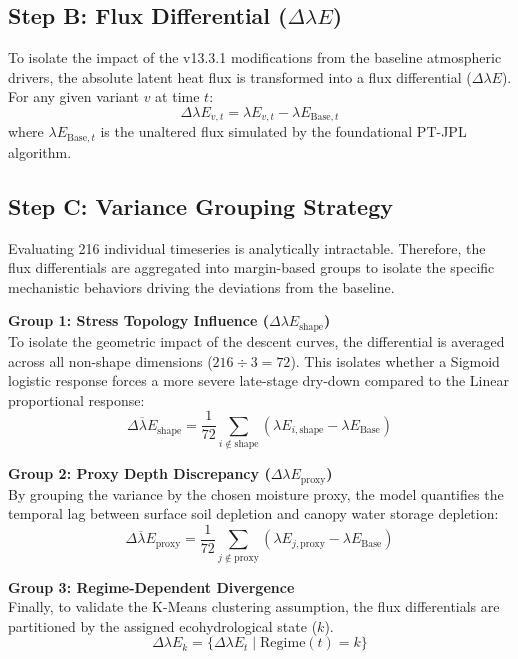 \documentclass[11pt]{article}
\begin{document}
\subsection*{Step B: Flux Differential ($\Delta \lambda E$)}

To isolate the impact of the v13.3.1 modifications from the baseline atmospheric drivers, the absolute latent heat flux is transformed into a flux differential ($\Delta \lambda E$). For any given variant $v$ at time $t$:
\begin{equation}
  \Delta \lambda E_{v,t} = \lambda E_{v,t} - \lambda E_{\mathrm{Base},t}
\end{equation}
where $\lambda E_{\mathrm{Base},t}$ is the unaltered flux simulated by the foundational PT-JPL algorithm.

\subsection*{Step C: Variance Grouping Strategy}

Evaluating 216 individual timeseries is analytically intractable. Therefore, the flux differentials are aggregated into margin-based groups to isolate the specific mechanistic behaviors driving the deviations from the baseline.

\textbf{Group 1: Stress Topology Influence ($\Delta \lambda E_{\mathrm{shape}}$)} \\
To isolate the geometric impact of the descent curves, the differential is averaged across all non-shape dimensions ($216 \div 3 = 72$). This isolates whether a Sigmoid logistic response forces a more severe late-stage dry-down compared to the Linear proportional response:
\begin{equation}
  \overline{\Delta \lambda E}_{\mathrm{shape}} = \frac{1}{72} \sum_{i \notin \mathrm{shape}} \left( \lambda E_{i, \mathrm{shape}} - \lambda E_{\mathrm{Base}} \right)
\end{equation}

\textbf{Group 2: Proxy Depth Discrepancy ($\Delta \lambda E_{\mathrm{proxy}}$)} \\
By grouping the variance by the chosen moisture proxy, the model quantifies the temporal lag between surface soil depletion and canopy water storage depletion:
\begin{equation}
  \overline{\Delta \lambda E}_{\mathrm{proxy}} = \frac{1}{72} \sum_{j \notin \mathrm{proxy}} \left( \lambda E_{j, \mathrm{proxy}} - \lambda E_{\mathrm{Base}} \right)
\end{equation}

\textbf{Group 3: Regime-Dependent Divergence} \\
Finally, to validate the K-Means clustering assumption, the flux differentials are partitioned by the assigned ecohydrological state ($k$).
\begin{equation}
  \Delta \lambda E_{k} = \{ \Delta \lambda E_{t} \mid \mathrm{Regime}(t) = k \}
\end{equation}
\end{document}
